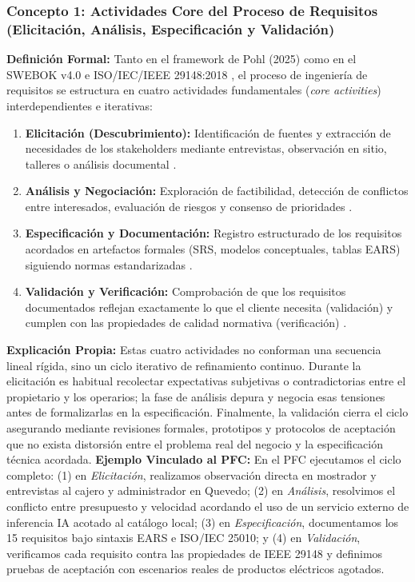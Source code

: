\subsubsection{Concepto 1: Actividades Core del Proceso de Requisitos (Elicitación, Análisis, Especificación y Validación)}
\textbf{Definición Formal:} Tanto en el framework de Pohl (2025) \cite{pohl2025} como en el SWEBOK v4.0 \cite{swebok2024} e ISO/IEC/IEEE 29148:2018 \cite{ieee29148}, el proceso de ingeniería de requisitos se estructura en cuatro actividades fundamentales (\textit{core activities}) interdependientes e iterativas:
\begin{enumerate}
	\item \textbf{Elicitación (Descubrimiento):} Identificación de fuentes y extracción de necesidades de los stakeholders mediante entrevistas, observación en sitio, talleres o análisis documental \cite{pohl2025, wiegers2013}.
	\item \textbf{Análisis y Negociación:} Exploración de factibilidad, detección de conflictos entre interesados, evaluación de riesgos y consenso de prioridades \cite{swebok2024, ireb2023}.
	\item \textbf{Especificación y Documentación:} Registro estructurado de los requisitos acordados en artefactos formales (SRS, modelos conceptuales, tablas EARS) siguiendo normas estandarizadas \cite{ieee29148, mavin2009ears}.
	\item \textbf{Validación y Verificación:} Comprobación de que los requisitos documentados reflejan exactamente lo que el cliente necesita (validación) y cumplen con las propiedades de calidad normativa (verificación) \cite{ieee29148, pohl2025}.
\end{enumerate}
\textbf{Explicación Propia:} Estas cuatro actividades no conforman una secuencia lineal rígida, sino un ciclo iterativo de refinamiento continuo. Durante la elicitación es habitual recolectar expectativas subjetivas o contradictorias entre el propietario y los operarios; la fase de análisis depura y negocia esas tensiones antes de formalizarlas en la especificación. Finalmente, la validación cierra el ciclo asegurando mediante revisiones formales, prototipos y protocolos de aceptación que no exista distorsión entre el problema real del negocio y la especificación técnica acordada.
\textbf{Ejemplo Vinculado al PFC:} En el PFC ejecutamos el ciclo completo: (1) en \textit{Elicitación}, realizamos observación directa en mostrador y entrevistas al cajero y administrador en Quevedo; (2) en \textit{Análisis}, resolvimos el conflicto entre presupuesto y velocidad acordando el uso de un servicio externo de inferencia IA acotado al catálogo local; (3) en \textit{Especificación}, documentamos los 15 requisitos bajo sintaxis EARS e ISO/IEC 25010; y (4) en \textit{Validación}, verificamos cada requisito contra las propiedades de IEEE 29148 y definimos pruebas de aceptación con escenarios reales de productos eléctricos agotados.
